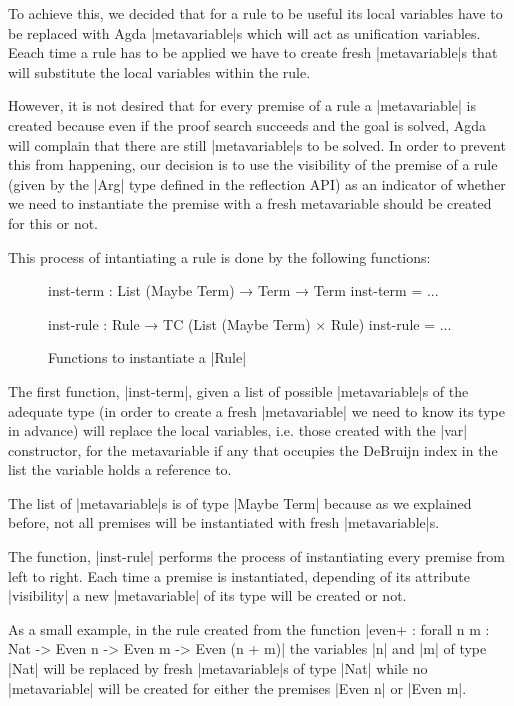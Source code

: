 \documentclass[a4paper]{article}
\begin{document}
To achieve this, we decided that for a rule to be useful its local variables
have to be replaced with Agda |metavariable|s which will act as unification
variables. Eeach time a rule has to be applied we have to create fresh
|metavariable|s that will substitute the local variables within the rule.

However, it is not desired that for every premise of a rule a |metavariable| is
created because even if the proof search succeeds and the goal is solved, Agda
will complain that there are still |metavariable|s to be solved. In order to
prevent this from happening, our decision is to use the visibility of the
premise of a rule (given by the |Arg| type defined in the reflection API) as an
indicator of whether we need to instantiate the premise with a fresh
metavariable should be created for this or not.

This process of intantiating a rule is done by the following functions:

\begin{figure}
\small
\begin{code}
  inst-term : List (Maybe Term) → Term → Term
  inst-term = ...

  inst-rule : Rule → TC (List (Maybe Term) × Rule)
  inst-rule = ...
\end{code}
  \label{fig:inst}
  \caption{Functions to instantiate a |Rule|}
\end{figure}

The first function, |inst-term|, given a list of possible |metavariable|s of the
adequate type (in order to create a fresh |metavariable| we need to know its
type in advance) will replace the local variables, i.e. those created with the
|var| constructor, for the metavariable if any that occupies the DeBruijn index
in the list the variable holds a reference to.

The list of |metavariable|s is of type |Maybe Term| because as we explained
before, not all premises will be instantiated with fresh |metavariable|s.

The function, |inst-rule| performs the process of instantiating every premise
from left to right. Each time a premise is instantiated, depending of its
attribute |visibility| a new |metavariable| of its type will be created or not.

As a small example, in the rule created from the function |even+ : forall {n m : Nat} -> Even n -> Even m -> Even (n + m)| the variables |n| and |m| of type
|Nat| will be replaced by fresh |metavariable|s of type |Nat| while no
|metavariable| will be created for either the premises |Even n| or |Even m|.
\end{document}
